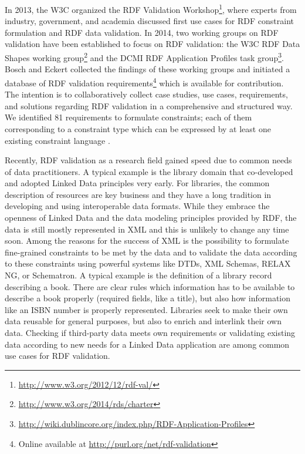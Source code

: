 \documentclass[a4paper,fontsize=11pt]{scrartcl}
\begin{document}
In 2013, the W3C organized the RDF Validation Workshop\footnote{\url{http://www.w3.org/2012/12/rdf-val/}}, 
where experts from industry, government, and academia discussed first use cases for RDF constraint
formulation and RDF data validation.
In 2014, two working groups on RDF validation have been established to focus on RDF validation: 
the W3C RDF Data Shapes working group\footnote{\url{http://www.w3.org/2014/rds/charter}} and the DCMI RDF Application Profiles task group\footnote{\url{http://wiki.dublincore.org/index.php/RDF-Application-Profiles}}. 
Bosch and Eckert \cite{BoschEckert2014} collected the findings of these working groups and initiated a database of RDF validation requirements\footnote{Online available at \url{http://purl.org/net/rdf-validation}}
which is available for contribution.
The intention is to collaboratively collect case studies, use cases, requirements, and solutions regarding RDF validation in a comprehensive and structured way. 
We identified 81 requirements to formulate constraints; each of them corresponding to a constraint type which can be expressed by at least one existing constraint language \cite{BoschNolleAcarEckert2015}. 

Recently, RDF validation as a research field gained speed due to common needs of data practitioners. A typical example is the library domain that co-developed and adopted Linked Data principles very early. For libraries, the common description of resources are key business and they have a long tradition in developing and using interoperable data formats. While they embrace the openness of Linked Data and the data modeling principles provided by RDF, the data is still mostly represented in XML and this is unlikely to change any time soon. 
Among the reasons for the success of XML is the possibility to formulate fine-grained constraints to be met by the data and to validate the data according to these constraints using powerful systems like DTDs, XML Schemas, RELAX NG, or Schematron.
A typical example is the definition of a library record describing a book. There are clear rules which information has to be available to describe a book properly (required fields, like a title), but also how information like an ISBN number is properly represented. Libraries seek to make their own data reusable for general purposes, but also to enrich and interlink their own data. Checking if third-party data meets own requirements or validating existing data according to new needs for a Linked Data application are among common use cases for RDF validation.
\end{document}
